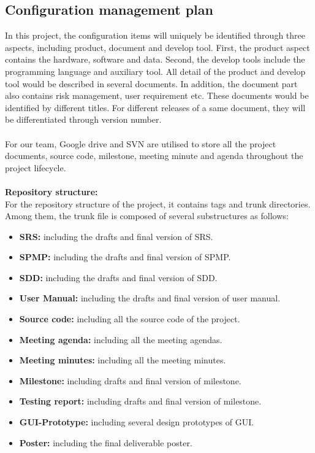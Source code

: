 \documentclass[11pt, a4paper]{article}
\begin{document}
\subsection{Configuration management plan}
In this project, the configuration items will uniquely be identified through three aspects, including product, document and develop tool. First, the product aspect contains the hardware, software and data. Second, the develop tools include the programming language and auxiliary tool. All detail of the product and develop tool would be described in several documents. In addition, the document part also contains risk management, user requirement etc. These documents would be identified by different titles. For different releases of a same document, they will be differentiated through version number.\\
\\
For our team, Google drive and SVN are utilised to store all the project documents, source code, milestone, meeting minute and agenda throughout the project lifecycle. \\
\\
\textbf{Repository structure:}\\
For the repository structure of the project, it contains tags and trunk directories. Among them, the trunk file is composed of several substructures as follows:\\
\begin{itemize}
\item {\bfseries SRS:} including the drafts and final version of SRS.\\
\item {\bfseries SPMP:} including the drafts and final version of SPMP.\\
\item {\bfseries SDD:} including the drafts and final version of SDD.\\
\item {\bfseries User Manual:} including the drafts and final version of user manual.\\
\item {\bfseries Source code:} including all the source code of the project.\\
\item {\bfseries Meeting agenda:} including all the meeting agendas.\\
\item {\bfseries Meeting minutes:} including all the meeting minutes.\\
\item {\bfseries Milestone:} including drafts and final version of milestone.\\
\item {\bfseries Testing report:} including drafts and final version of milestone.\\
\item {\bfseries GUI-Prototype:} including several design prototypes of GUI.\\
\item {\bfseries Poster:} including the final deliverable poster.\\
\end{itemize}
\end{document}
